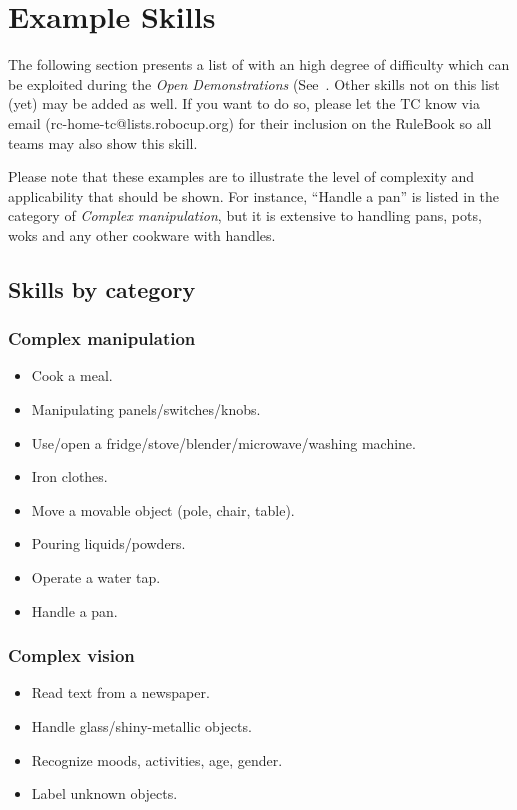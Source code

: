 \chapter{Example Skills}
\label{chap:example-skills}

The following section presents a list of  with an high degree of difficulty which can be exploited during the \textit{Open Demonstrations} (See~.
Other skills not on this list (yet) may be added as well. If you want to do so, please let the TC know via email (rc-home-tc@lists.robocup.org) for their inclusion on the RuleBook so all teams may also show this skill.

Please note that these examples are to illustrate the level of complexity and applicability that should be shown. For instance, \enquote{Handle a pan} is listed in the category of \textit{Complex manipulation}, but it is extensive to handling pans, pots, woks and any other cookware with handles.

\section{Skills by category}

\subsection{Complex manipulation}
\begin{itemize}
	\item Cook a meal.
	\item Manipulating panels/switches/knobs.
	\item Use/open a fridge/stove/blender/microwave/washing machine.
	\item Iron clothes.
	\item Move a movable object (pole, chair, table).
	\item Pouring liquids/powders.
	\item Operate a water tap.
	\item Handle a pan.
\end{itemize}

\subsection{Complex vision}
\begin{itemize}
	\item Read text from a newspaper.
	\item Handle glass/shiny-metallic objects.
	\item Recognize moods, activities, age, gender.
	\item Label unknown objects.
\end{itemize}

